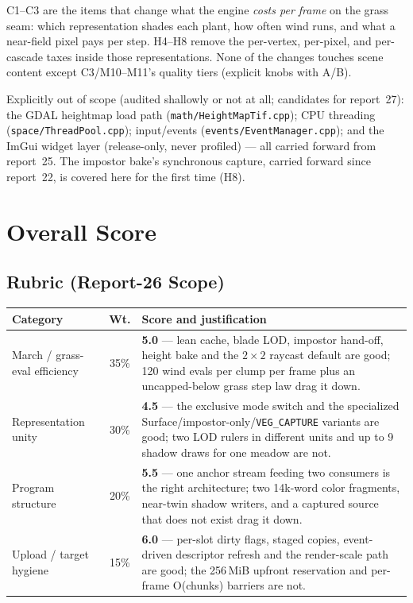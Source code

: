 \documentclass[11pt,a4paper]{article}
\begin{document}
C1--C3 are the items that change what the engine \emph{costs per frame} on
the grass seam: which representation shades each plant, how often wind runs,
and what a near-field pixel pays per step. H4--H8 remove the per-vertex,
per-pixel, and per-cascade taxes inside those representations. None of the
changes touches scene content except C3/M10--M11's quality tiers (explicit
knobs with A/B).

Explicitly out of scope (audited shallowly or not at all; candidates for
report~27): the GDAL heightmap load path
(\texttt{math/HeightMapTif.cpp}); CPU threading
(\texttt{space/ThreadPool.cpp}); input/events
(\texttt{events/EventManager.cpp}); and the ImGui widget layer
(release-only, never profiled) --- all carried forward from report~25. The
impostor bake's synchronous capture, carried forward since report~22, is
covered here for the first time (H8).

\section{Overall Score}
\label{sec:score26}

\subsection{Rubric (Report-26 Scope)}

\begin{table}[h]
\centering
\small
\begin{tabular}{@{}lcp{7.2cm}@{}}
\toprule
\textbf{Category} & \textbf{Wt.} & \textbf{Score and justification} \\
\midrule
March / grass-eval efficiency & 35\% & \textbf{5.0} --- lean cache, blade LOD,
impostor hand-off, height bake and the $2\times2$ raycast default are good;
120 wind evals per clump per frame plus an uncapped-below grass step law drag
it down. \\
Representation unity & 30\% & \textbf{4.5} --- the exclusive mode switch and
the specialized Surface/impostor-only/\texttt{VEG\_CAPTURE} variants are
good; two LOD rulers in different units and up to 9 shadow draws for one
meadow are not. \\
Program structure & 20\% & \textbf{5.5} --- one anchor stream feeding two
consumers is the right architecture; two 14k-word color fragments, near-twin
shadow writers, and a captured source that does not exist drag it down. \\
Upload / target hygiene & 15\% & \textbf{6.0} --- per-slot dirty flags,
staged copies, event-driven descriptor refresh and the render-scale path are
good; the 256\,MiB upfront reservation and per-frame O(chunks) barriers are
not. \\
\bottomrule
\end{tabular}
\end{table}
\end{document}
